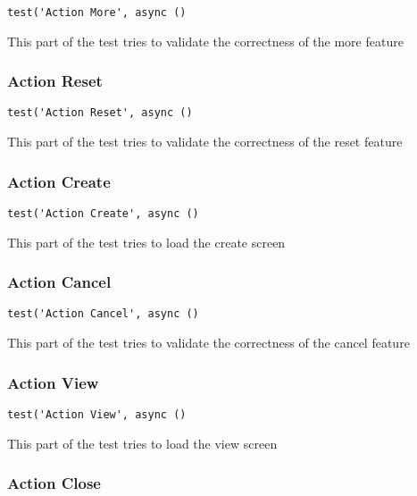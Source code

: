 \documentclass[a4paper]{article}
\begin{document}
\begin{lstlisting}
test('Action More', async ()
\end{lstlisting}

This part of the test tries to validate the correctness of the more feature

\hypertarget{toc119}{}
\subsubsection{Action Reset}

\begin{lstlisting}
test('Action Reset', async ()
\end{lstlisting}

This part of the test tries to validate the correctness of the reset feature

\hypertarget{toc120}{}
\subsubsection{Action Create}

\begin{lstlisting}
test('Action Create', async ()
\end{lstlisting}

This part of the test tries to load the create screen

\hypertarget{toc121}{}
\subsubsection{Action Cancel}

\begin{lstlisting}
test('Action Cancel', async ()
\end{lstlisting}

This part of the test tries to validate the correctness of the cancel feature

\hypertarget{toc122}{}
\subsubsection{Action View}

\begin{lstlisting}
test('Action View', async ()
\end{lstlisting}

This part of the test tries to load the view screen

\hypertarget{toc123}{}
\subsubsection{Action Close}
\end{document}
